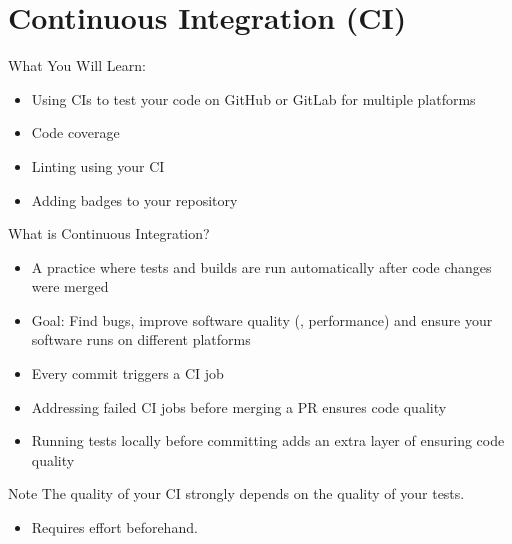 \section{Continuous Integration (CI)}

\begin{frame}[fragile]{What You Will Learn:}
  \begin{itemize}
    \item Using CIs to test your code on GitHub or GitLab for multiple platforms
    \item Code coverage
    \item Linting using your CI
    \item Adding badges to your repository
  \end{itemize}
\end{frame}


\begin{frame}[fragile]{What is Continuous Integration?}
  \begin{itemize}
    \setlength{\itemsep}{1em}
    \item A practice where tests and builds are run automatically after code changes were
      merged
    \item Goal: Find bugs, improve software quality (\eg, performance) and ensure
      your software runs on different platforms
    \item Every commit triggers a CI job
    \item Addressing failed CI jobs before merging a PR ensures code quality
    \item Running tests locally before committing adds an extra layer of ensuring code quality
  \end{itemize}
  \begin{block}{Note}
     The quality of your CI strongly depends on the quality of your tests.
     \begin{itemize}
      \item Requires effort beforehand.
     \end{itemize}
  \end{block}
\end{frame}

